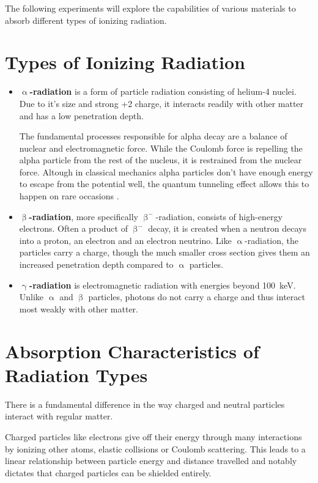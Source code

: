 
The following experiments will explore the capabilities of various materials to absorb different types of ionizing radiation.

\section{Types of Ionizing Radiation}
\begin{itemize}
	\item \textbf{$\upalpha$-radiation} is a form of particle radiation consisting of helium-4 nuclei.
	Due to it's size and strong +2 charge, it interacts readily with other matter and has a low penetration depth.

	The fundamental processes responsible for alpha decay are a balance of nuclear and electromagnetic force.
	While the Coulomb force is repelling the alpha particle from the rest of the nucleus, it is restrained from the nuclear force.
	Altough in classical mechanics alpha particles don't have enough energy to escape from the potential well, the quantum tunneling effect allows this to happen on rare occasions .
	\item \textbf{$\upbeta$-radiation}, more specifically $\upbeta^{-}$-radiation, consists of high-energy electrons.
	Often a product of $\upbeta^{-}$ decay, it is created when a neutron decays into a proton, an electron and an electron neutrino.
	Like $\upalpha$-radiation, the particles carry a charge, though the much smaller cross section gives them an increased penetration depth compared to $\upalpha$ particles.
	\item \textbf{$\upgamma$-radiation} is electromagnetic radiation with energies beyond \SI{100}{\kilo\electronvolt}.
	Unlike $\upalpha$ and $\upbeta$ particles, photons do not carry a charge and thus interact most weakly with other matter.
\end{itemize}

\section{Absorption Characteristics of Radiation Types}
There is a fundamental difference in the way charged and neutral particles interact with regular matter.

Charged particles like electrons give off their energy through many interactions by ionizing other atoms, elastic collisions or Coulomb scattering.
This leads to a linear relationship between particle energy and distance travelled and notably dictates that charged particles can be shielded entirely.

